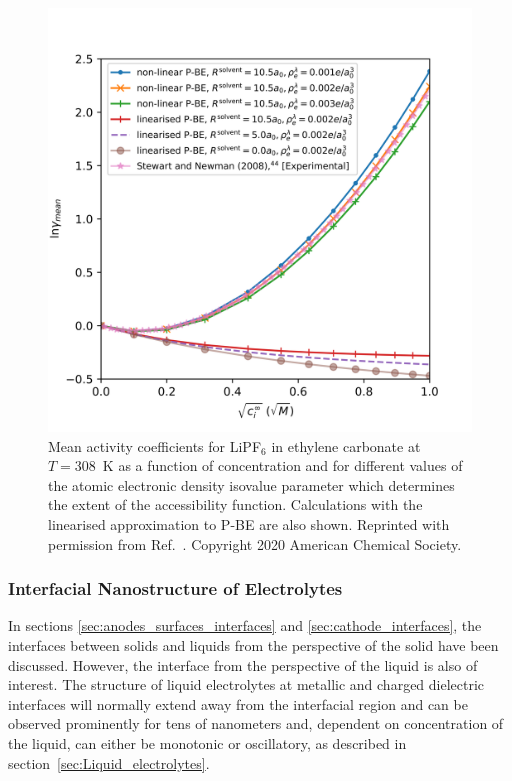 \documentclass[../main.tex]{subfiles}
\begin{document}
\begin{figure}
    \includegraphics[scale=0.8]{figures/lipf6.png}
    \caption{Mean activity coefficients for LiPF$_6$ in ethylene carbonate at $T=308$~K as a function of concentration and for different values of the atomic electronic density isovalue parameter which determines the extent of the accessibility function. Calculations with the linearised approximation to P-BE are also shown. Reprinted with permission from Ref.~. Copyright 2020 American Chemical Society.}
    \label{fig:ac}
\end{figure}

\subsubsection{Interfacial Nanostructure of Electrolytes}
In sections \ref{sec:anodes_surfaces_interfaces} and \ref{sec:cathode_interfaces}, the interfaces between solids and liquids from the perspective of the solid have been discussed. However, the interface from the perspective of the liquid is also of interest. The structure of liquid electrolytes at metallic\cite{merlet_simulating_2013} and charged dielectric\cite{smith_electrostatic_2016} interfaces will normally extend away from the interfacial region and can be observed prominently for tens of nanometers and, dependent on concentration of the liquid, can either be monotonic or oscillatory, as described in section~\ref{sec:Liquid_electrolytes}.
\end{document}
